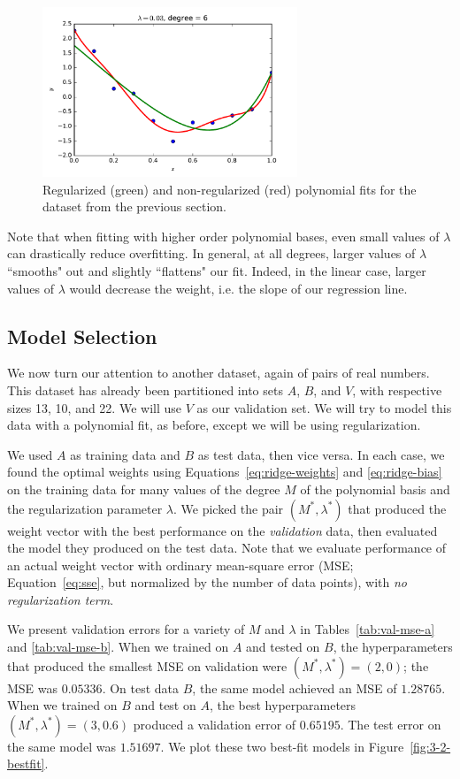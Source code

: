 \documentclass{article}
\begin{document}
\begin{multicols}{2}
\begin{figure}[p]
   \includegraphics[width=3in]{img/3-1_ridge_lambd30_degree6.pdf}
   \caption{Regularized (green) and non-regularized (red) polynomial fits for the dataset from the previous section.}
   \label{fig:ridge}
\end{figure}

Note that when fitting with higher order polynomial bases, even small values of $\lambda$ can drastically reduce overfitting. In general, at all degrees, larger values of $\lambda$ ``smooths" out and slightly ``flattens" our fit. Indeed, in the linear case, larger values of $\lambda$ would decrease the weight, i.e. the slope of our regression line.


\subsection{Model Selection}

We now turn our attention to another dataset, again of pairs of real numbers. This dataset has already been partitioned into sets $A$, $B$, and $V$, with respective sizes 13, 10, and 22. We will use $V$ as our validation set. We will try to model this data with a polynomial fit, as before, except we will be using regularization.

We used $A$ as training data and $B$ as test data, then vice versa.
In each case, we found the optimal weights using Equations~\ref{eq:ridge-weights} and \ref{eq:ridge-bias} on the training data for many values of the degree $M$ of the polynomial basis and the regularization parameter $\lambda$. We picked the pair $(M^*, \lambda^*)$ that produced the weight vector with the best performance on the \emph{validation} data, then evaluated the model they produced on the test data.
Note that we evaluate performance of an actual weight vector with ordinary mean-square error (MSE; Equation~\ref{eq:sse}, but normalized by the number of data points), with \emph{no regularization term}.

We present validation errors for a variety of $M$ and $\lambda$ in Tables~\ref{tab:val-mse-a} and \ref{tab:val-mse-b}.
When we trained on $A$ and tested on $B$, the hyperparameters that produced the smallest MSE on validation were $(M^*,\lambda^*)=(2,0)$; the MSE was $0.05336$. On test data $B$, the same model achieved an MSE of $1.28765$.
When we trained on $B$ and test on $A$, the best hyperparameters $(M^*,\lambda^*)=(3,0.6)$ produced a validation error of $0.65195$. The test error on the same model was $1.51697$.
We plot these two best-fit models in Figure~\ref{fig:3-2-bestfit}.



\end{multicols}
\end{document}
